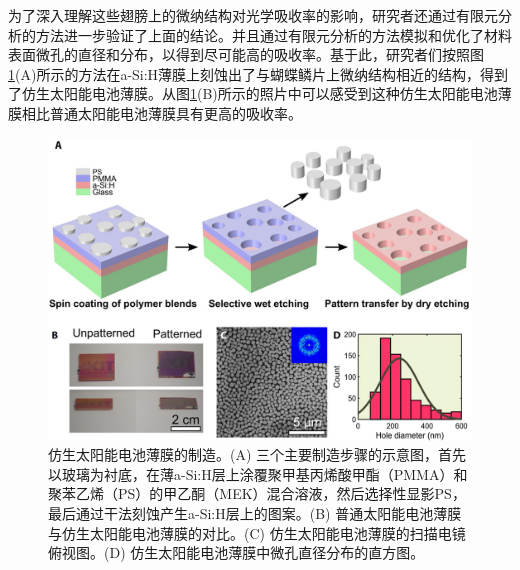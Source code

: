 \documentclass{assignment}
\begin{document}
\begin{da}
\begin{itemize}
        为了深入理解这些翅膀上的微纳结构对光学吸收率的影响，研究者还通过有限元分析的方法进一步验证了上面的结论。并且通过有限元分析的方法模拟和优化了材料表面微孔的直径和分布，以得到尽可能高的吸收率。基于此，研究者们按照图\ref{Butterfly-Wings-Fabrication}(A)所示的方法在a-Si:H薄膜上刻蚀出了与蝴蝶鳞片上微纳结构相近的结构，得到了仿生太阳能电池薄膜。从图\ref{Butterfly-Wings-Fabrication}(B)所示的照片中可以感受到这种仿生太阳能电池薄膜相比普通太阳能电池薄膜具有更高的吸收率。
        \begin{figure}[H]
            \centering
            \includegraphics[width=.6\columnwidth]{Butterfly-Wings-Fabrication.jpg}
            \caption{仿生太阳能电池薄膜的制造\cite{siddique2017bioinspired}。(A) 三个主要制造步骤的示意图，首先以玻璃为衬底，在薄a-Si:H层上涂覆聚甲基丙烯酸甲酯（PMMA）和聚苯乙烯（PS）的甲乙酮（MEK）混合溶液，然后选择性显影PS，最后通过干法刻蚀产生a-Si:H层上的图案。(B) 普通太阳能电池薄膜与仿生太阳能电池薄膜的对比。(C) 仿生太阳能电池薄膜的扫描电镜俯视图。(D) 仿生太阳能电池薄膜中微孔直径分布的直方图。}
            \label{Butterfly-Wings-Fabrication}
        \end{figure}


\end{itemize}
\end{da}
\end{document}
